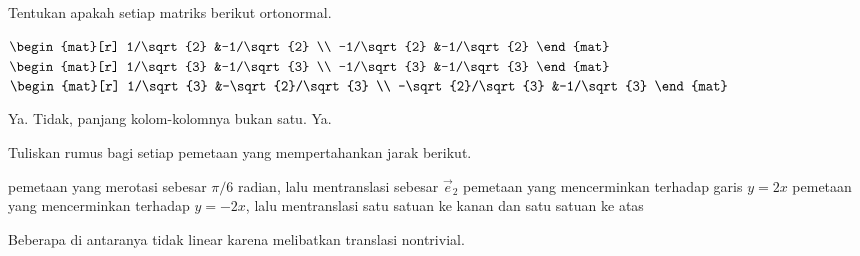 \begin{exercises}
  \item 
    Tentukan apakah setiap matriks berikut ortonormal.
    \begin{exparts}
      \partsitem $\begin{mat}[r]
                    1/\sqrt{2} &-1/\sqrt{2}  \\
                   -1/\sqrt{2} &-1/\sqrt{2}
                  \end{mat}$
      \partsitem $\begin{mat}[r]
                    1/\sqrt{3} &-1/\sqrt{3}  \\
                   -1/\sqrt{3} &-1/\sqrt{3}
                  \end{mat}$
      \partsitem $\begin{mat}[r]
                    1/\sqrt{3} &-\sqrt{2}/\sqrt{3}  \\
                   -\sqrt{2}/\sqrt{3} &-1/\sqrt{3}
                  \end{mat}$
    \end{exparts}
    \begin{answer}
      \begin{exparts}
        \partsitem Ya.
        \partsitem Tidak, panjang kolom-kolomnya bukan satu.
        \partsitem Ya.
      \end{exparts}
    \end{answer}
  \item 
    Tuliskan rumus bagi setiap pemetaan yang mempertahankan jarak berikut.
    \begin{exparts}  
      \partsitem pemetaan yang merotasi sebesar $\pi/6$ radian, lalu
        mentranslasi sebesar $\vec{e}_2$
      \partsitem pemetaan yang mencerminkan terhadap garis $y=2x$
      \partsitem pemetaan yang mencerminkan terhadap $y=-2x$, lalu
        mentranslasi satu satuan ke kanan dan satu satuan ke atas
    \end{exparts}
    \begin{answer}
      Beberapa di antaranya tidak linear karena melibatkan translasi
      nontrivial.
\end{answer}
\end{exercises}
